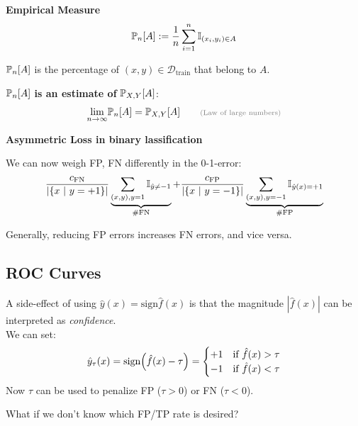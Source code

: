  \textbf{Empirical Measure}\\
$$
    \P_n[A] := \frac{1}{n}\sum_{i=1}^{n}\I_{(x_i,y_i) \in A}
$$

$\P_n[A]$ is the percentage of $(x,y) \in \mathcal{D}_\text{train}$ that belong to $A$.

\lemma $\P_n[A]$ \textbf{is an estimate of} $\P_{X,Y}[A]$:
$$
    \underset{n\to\infty}{\lim} \P_n[A] = \P_{X,Y}[A] \qquad \text{\color{gray}\scriptsize (Law of large numbers)}
$$

\remark \textbf{Asymmetric Loss in binary lassification}

We can now weigh FP, FN differently in the 0-1-error:
{\small
$$
    \frac{c_\text{FN}}{|\{ x \sep y=+1 \}|} \underbrace{\sum_{(x,y), y=1} \I_{\hat{y}\neq -1}}_\text{\#FN} + \frac{c_\text{FP}}{|\{x \sep y =-1 \}|}\underbrace{\sum_{(x,y), y=-1} \I_{\hat{y}(x)=+1}}_\text{\#FP}
$$
}

Generally, reducing FP errors increases FN errors, and vice versa.


\newpage
\subsection{ROC Curves}

\remark A side-effect of using $\hat{y}(x) = \text{sign}\hat{f}(x)$ is that the magnitude $|\hat{f}(x)|$ can be interpreted as \textit{confidence}.\\
We can set:
$$
    \hat{y}_\tau(x) = \text{sign}\Bigl( \hat{f}(x) - \tau \Bigr) = \begin{cases}
        +1 & \text{if } \hat{f}(x) > \tau \\
        -1 & \text{if } \hat{f}(x) < \tau
    \end{cases}
$$
Now $\tau$ can be used to penalize FP ($\tau > 0$) or FN ($\tau < 0$).\\

What if we don't know which FP/TP rate is desired?\\

